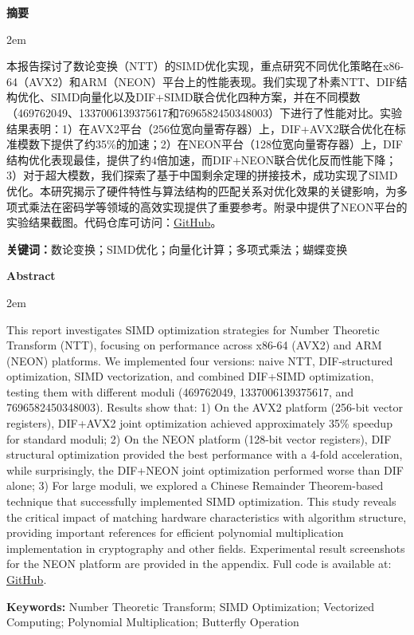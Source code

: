 \documentclass[a4paper,colorlinks=true,linkcolor=blue,urlcolor=blue,citecolor=green,bookmarks=true]{article}
\newenvironment{cnabstract}{
    \par\small
    \noindent\mbox{}\par\vspace{-\baselineskip}
    \par\songti\parindent 2em
    }
    {\par\vspace{1em}}
\newenvironment{enabstract}{
    \par\small
    \noindent\mbox{}\par\vspace{-\baselineskip}
    \par\parindent 2em
    }
    {\par\vspace{1em}}
\begin{document}
\clearpage
{}
\begin{center}{\songti\bfseries{摘\quad 要}}\end{center}\par\vspace{0.5em}
\begin{cnabstract}
本报告探讨了数论变换（NTT）的SIMD优化实现，重点研究不同优化策略在x86-64（AVX2）和ARM（NEON）平台上的性能表现。我们实现了朴素NTT、DIF结构优化、SIMD向量化以及DIF+SIMD联合优化四种方案，并在不同模数（469762049、1337006139375617和7696582450348003）下进行了性能对比。实验结果表明：1）在AVX2平台（256位宽向量寄存器）上，DIF+AVX2联合优化在标准模数下提供了约35\%的加速；2）在NEON平台（128位宽向量寄存器）上，DIF结构优化表现最佳，提供了约4倍加速，而DIF+NEON联合优化反而性能下降；3）对于超大模数，我们探索了基于中国剩余定理的拼接技术，成功实现了SIMD优化。本研究揭示了硬件特性与算法结构的匹配关系对优化效果的关键影响，为多项式乘法在密码学等领域的高效实现提供了重要参考。附录中提供了NEON平台的实验结果截图。代码仓库可访问：\href{https://github.com/aokimi0/parallel-programming}{GitHub}。

\vspace{1em}
\noindent\textbf{关键词：}数论变换；SIMD优化；向量化计算；多项式乘法；蝴蝶变换
\end{cnabstract}

\begin{center}{\bfseries{Abstract}}\end{center}\par\vspace{0.5em}
\begin{enabstract}
This report investigates SIMD optimization strategies for Number Theoretic Transform (NTT), focusing on performance across x86-64 (AVX2) and ARM (NEON) platforms. We implemented four versions: naive NTT, DIF-structured optimization, SIMD vectorization, and combined DIF+SIMD optimization, testing them with different moduli (469762049, 1337006139375617, and 7696582450348003). Results show that: 1) On the AVX2 platform (256-bit vector registers), DIF+AVX2 joint optimization achieved approximately 35\% speedup for standard moduli; 2) On the NEON platform (128-bit vector registers), DIF structural optimization provided the best performance with a 4-fold acceleration, while surprisingly, the DIF+NEON joint optimization performed worse than DIF alone; 3) For large moduli, we explored a Chinese Remainder Theorem-based technique that successfully implemented SIMD optimization. This study reveals the critical impact of matching hardware characteristics with algorithm structure, providing important references for efficient polynomial multiplication implementation in cryptography and other fields. Experimental result screenshots for the NEON platform are provided in the appendix. Full code is available at: \href{https://github.com/aokimi0/parallel-programming}{GitHub}.

\vspace{1em}
\noindent\textbf{Keywords:} Number Theoretic Transform; SIMD Optimization; Vectorized Computing; Polynomial Multiplication; Butterfly Operation
\end{enabstract}
\end{document}
